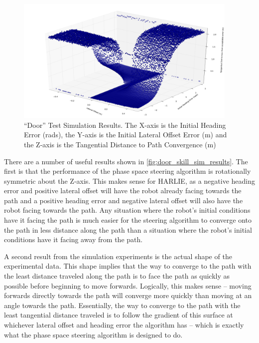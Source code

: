 \begin{figure}
\centering
\includegraphics[width=0.95\textwidth]{images/acceptable_error_surface}
\caption[``Door'' Test Simulation Results]{``Door'' Test Simulation Results. The X-axis is the Initial Heading Error (rads), the Y-axis is the Initial Lateral Offset Error (m) and the Z-axis is the Tangential Distance to Path Convergence (m)}
\label{fig:door_skill_sim_results}
\end{figure}

There are a number of useful results shown in \autoref{fig:door_skill_sim_results}. The first is that the performance of the phase space steering algorithm is rotationally symmetric about the Z-axis. This makes sense for HARLIE, as a negative heading error and positive lateral offset will have the robot already facing towards the path and a positive heading error and negative lateral offset will also have the robot facing towards the path. Any situation where the robot's initial conditions have it facing the path is much easier for the steering algorithm to converge onto the path in less distance along the path than a situation where the robot's initial conditions have it facing away from the path.

A second result from the simulation experiments is the actual shape of the experimental data. This shape implies that the way to converge to the path with the least distance traveled along the path is to face the path as quickly as possible before beginning to move forwards. Logically, this makes sense -- moving forwards directly towards the path will converge more quickly than moving at an angle towards the path. Essentially, the way to converge to the path with the least tangential distance traveled is to follow the gradient of this surface at whichever lateral offset and heading error the algorithm has -- which is exactly what the phase space steering algorithm is designed to do.

